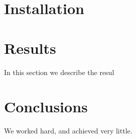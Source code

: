 \documentclass[11pt]{article}
\begin{document}
\section{Installation}

\section{Results}\label{results}
In this section we describe the resul

\section{Conclusions}\label{conclusions}
We worked hard, and achieved very little.



\end{document}
